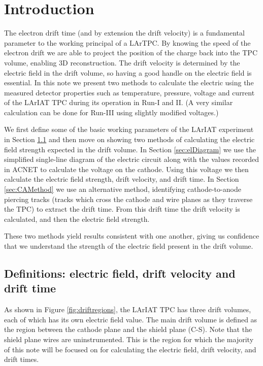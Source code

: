 \section{Introduction}\label{sec:Introduction} \label{sec:Intro}
The electron drift time (and by extension the drift velocity) is a fundamental parameter to the working principal of a LArTPC. By knowing the speed of the electron drift we are able to project the position of the charge back into the TPC volume, enabling 3D reconstruction. The drift velocity is determined by the electric field in the drift volume, so having a good handle on the electric field is essential. In this note we present two methods to calculate the electric using the measured detector properties such as temperature, pressure, voltage and current of the LArIAT TPC during its operation in Run-I and II. (A very similar calculation can be done for Run-III using slightly modified voltages.)

We first define some of the basic working parameters of the LArIAT experiment in Section \ref{sec:Def} and then move on showing two methods of calculating the electric field strength expected in the drift volume. In Section \ref{sec:elDiagram} we use the simplified single-line diagram of the electric circuit along with the values recorded in ACNET to calculate the voltage on the cathode. Using this voltage we then calculate the electric field strength, drift velocity, and drift time. In Section \ref{sec:CAMethod} we use an alternative method, identifying cathode-to-anode piercing tracks (tracks which cross the cathode and wire planes as they traverse the TPC) to extract the drift time. From this drift time the drift velocity is calculated, and then the electric field strength. 

These two methods yield results consistent with one another, giving us confidence that we understand the strength of the electric field present in the drift volume.

\subsection{Definitions: electric field, drift velocity and drift time }\label{sec:Def}
As shown in Figure \ref{fig:driftregions}, the LArIAT TPC has three drift volumes, each of which has its own electric field value. The main drift volume is defined as the region between the cathode plane and the shield plane (C-S). Note that the shield plane wires are uninstrumented. This is the region for which the majority of this note will be focused on for calculating the electric field, drift velocity, and drift times.

